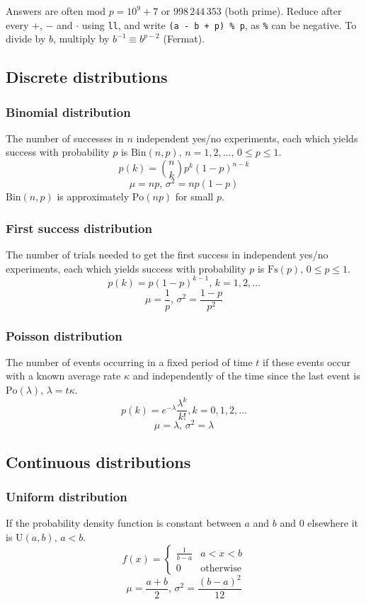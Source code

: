 Answers are often mod $p = 10^9+7$ or $998\,244\,353$ (both prime).
Reduce after every $+$, $-$ and $\cdot$ using \texttt{ll}, and write \texttt{(a - b + p) \% p}, as \texttt{\%} can be negative.
To divide by $b$, multiply by $b^{-1} \equiv b^{p-2}$ (Fermat).

\subsection{Discrete distributions}

\subsubsection{Binomial distribution}
The number of successes in $n$ independent yes/no experiments, each which yields success with probability $p$ is $\textrm{Bin}(n,p),\,n=1,2,\dots,\, 0\leq p\leq1$.
\[p(k)=\binom{n}{k}p^k(1-p)^{n-k}\]
\[\mu = np,\,\sigma^2=np(1-p)\]
$\textrm{Bin}(n,p)$ is approximately $\textrm{Po}(np)$ for small $p$.

\subsubsection{First success distribution}
The number of trials needed to get the first success in independent yes/no experiments, each which yields success with probability $p$ is $\textrm{Fs}(p),\,0\leq p\leq1$.
\[p(k)=p(1-p)^{k-1},\,k=1,2,\dots\]
\[\mu = \frac1p,\,\sigma^2=\frac{1-p}{p^2}\]

\subsubsection{Poisson distribution}
The number of events occurring in a fixed period of time $t$ if these events occur with a known average rate $\kappa$ and independently of the time since the last event is $\textrm{Po}(\lambda),\,\lambda=t\kappa$.
\[p(k)=e^{-\lambda}\frac{\lambda^k}{k!}, k=0,1,2,\dots\]
\[\mu=\lambda,\,\sigma^2=\lambda\]

\subsection{Continuous distributions}

\subsubsection{Uniform distribution}
If the probability density function is constant between $a$ and $b$ and 0 elsewhere it is $\textrm{U}(a,b),\,a<b$.
\[f(x) = \left\{
\begin{array}{cl}
\frac{1}{b-a} & a<x<b\\
0 & \textrm{otherwise}
\end{array}\right.\]
\[\mu=\frac{a+b}{2},\,\sigma^2=\frac{(b-a)^2}{12}\]


